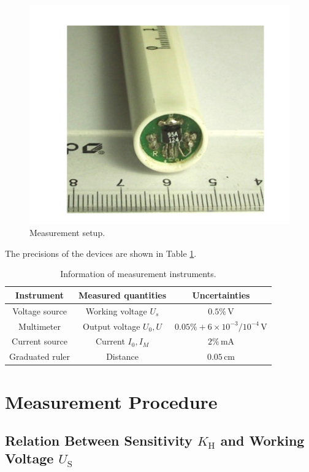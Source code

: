 \documentclass{article}
\begin{document}
\begin{figure}[H]
\centering
\includegraphics[scale=1.0]{probe.png}
\caption{Measurement setup.}\label{FigProbe}
\end{figure}

The precisions of the devices are shown in Table \ref{tablePrecision}.
\begin{table}[htbp]
\centering
\begin{tabular}{ccc}
\toprule
Instrument & Measured quantities & Uncertainties \\ 
\hline
Voltage source & Working voltage $U_{s}$ & $0.5\%\,$V \\ 
Multimeter & Output voltage $U_{0}, U$ & $0.05\% + 6\times 10^{-3}/10^{-4}\,$V \\ 
Current source & Current $I_{0}, I_{M}$ & $2\%\,$mA \\ 
Graduated ruler & Distance & $0.05\,$cm \\
\bottomrule
\end{tabular}
\caption{Information of measurement instruments.}\label{tablePrecision}
\end{table}



		\section{Measurement Procedure}
		
	\subsection{Relation Between Sensitivity $K_\text{H}$ and Working Voltage $U_\text{S}$\label{proc}}
	
\end{document}
